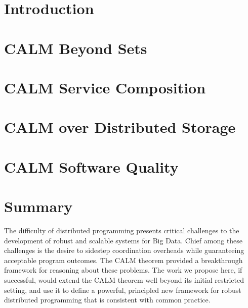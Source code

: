 \documentclass[11pt, us-letter]{article}
\begin{document}


\pagebreak

\section{Introduction}
\label{sec:intro}


\section{CALM Beyond Sets}
\label{sec:lattice}


\section{CALM Service Composition}
\label{sec:soa}


\section{CALM over Distributed Storage}
\label{sec:storage}


\section{CALM Software Quality}
\label{sec:qa}


% 

% 

% 
% 
% 

\section{Summary}
The difficulty of distributed programming presents critical challenges to the development of robust and scalable systems for Big Data.  Chief among these challenges is the desire to sidestep coordination overheads while guaranteeing acceptable program outcomes.  The CALM theorem provided a breakthrough framework for reasoning about these problems.  The work we propose here, if successful, would extend the CALM theorem well beyond its initial restricted setting, and use it to define a powerful, principled new framework for robust distributed programming that is consistent with common practice.  

\newpage


\end{document}
